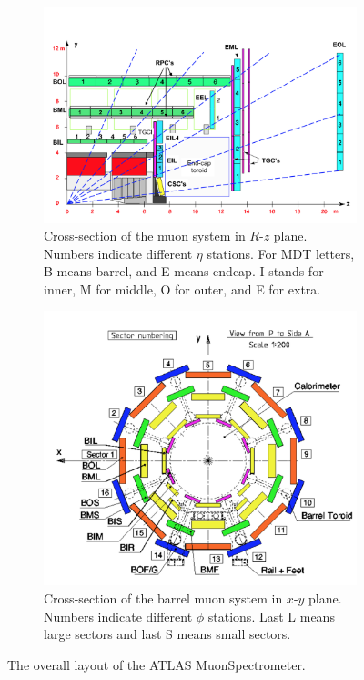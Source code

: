 \begin{figure}[htbp!]
\centering
\captionsetup{justification=centering}
    \begin{subfigure}[b]{0.5\textwidth}
        \includegraphics[width=\textwidth]{figures/detector/MS_rz}
        \caption{Cross-section of the muon system in $R$-$z$ plane. Numbers indicate different $\eta$ stations. For MDT letters, B means barrel, and E means endcap. I stands for inner, M for middle, O for outer, and E for extra.}
        \label{fig:MS_rz}
    \end{subfigure}
    \quad
    \begin{subfigure}[b]{0.3\textwidth}
        \includegraphics[width=\textwidth]{figures/detector/MS_phi}
        \caption{Cross-section of the barrel muon system in $x$-$y$ plane. Numbers indicate different $\phi$ stations. Last L means large sectors and last S means small sectors.}
        \label{fig:MS_phi}
    \end{subfigure}
\caption{The overall layout of the ATLAS MuonSpectrometer.}
\label{fig:Det_MS}
\end{figure}


